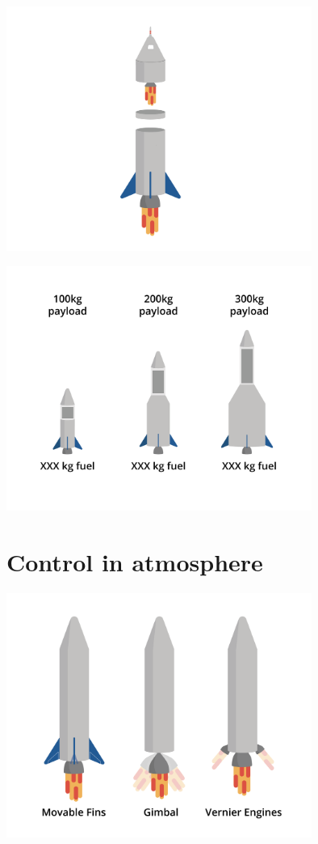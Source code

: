 		\includegraphics[width=0.75\textwidth]{staging.png}


		\includegraphics[width=0.75\textwidth]{rocketFuelWeight.png}


\section{Control in atmosphere}

	

	\includegraphics[width=0.75\textwidth]{control.png}


